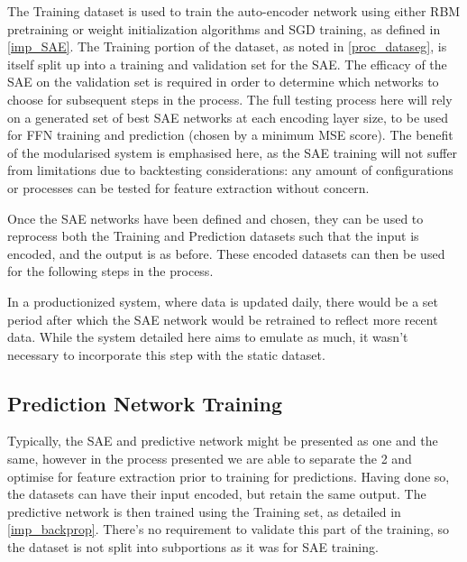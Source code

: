 \documentclass[a4paper,latin]{paper}
\begin{document}
The Training dataset is used to train the auto-encoder network using either RBM pretraining or weight initialization algorithms and SGD training, as defined in \ref{imp_SAE}. The Training portion of the dataset, as noted in \ref{proc_dataseg}, is itself split up into a training and validation set for the SAE. The efficacy of the SAE on the validation set is required in order to determine which networks to choose for subsequent steps in the process. The full testing process here will rely on a generated set of best SAE networks at each encoding layer size, to be used for FFN training and prediction (chosen by a minimum MSE score). The benefit of the modularised system is emphasised here, as the SAE training will not suffer from limitations due to backtesting considerations: any amount of configurations or processes can be tested for feature extraction without concern. \newline

Once the SAE networks have been defined and chosen, they can be used to reprocess both the Training and Prediction datasets such that the input is encoded, and the output is as before. These encoded datasets can then be used for the following steps in the process. \newline

In a productionized system, where data is updated daily, there would be a set period after which the SAE network would be retrained to reflect more recent data. While the system detailed here aims to emulate as much, it wasn't necessary to incorporate this step with the static dataset. \newline

\subsection{Prediction Network Training}\label{proc_predictionnetwork}

Typically, the SAE and predictive network might be presented as one and the same, however in the process presented we are able to separate the 2 and optimise for feature extraction prior to training for predictions. Having done so, the datasets can have their input encoded, but retain the same output. The predictive network is then trained using the Training set, as detailed in \ref{imp_backprop}. There's no requirement to validate this part of the training, so the dataset is not split into subportions as it was for SAE training. \newline
\end{document}
